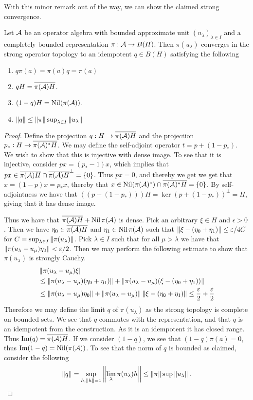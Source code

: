 With this minor remark out of the way, we can show the claimed strong convergence. 
\begin{proposition}\label{mesrennie17}
	Let $\mathcal{A}$ be an operator algebra with bounded approximate unit $(u_{\lambda})_{\lambda \in I}$ and a completely bounded representation $\pi:\mathcal{A} \to B(H)$. Then $\pi(u_\lambda)$ converges in the strong operator topology to an idempotent $q\in B(H)$ satisfying the following 
	\begin{enumerate}
		\item
			$q\pi(a)=\pi(a)q=\pi(a)$
		\item
			$qH=\overline{\pi(\mathcal{A})H}$. 
		\item
			$(1-q)H=\operatorname{Nil}(\pi(\mathcal{A}))$. 
		\item
			$\left \Vert q \right \Vert\leq \left \Vert \pi \right \Vert\sup_{\lambda \in I}\left \Vert u_\lambda \right \Vert$
	\end{enumerate}
\end{proposition}
\begin{proof}
	Define the projection $q:H\to \overline{\pi(\mathcal{A})H}$ and the projection $p_*:H\to \overline{\pi(\mathcal{A})^*H}$. We may define the self-adjoint operator $t=p+(1-p_*)$. We wish to show that this is injective with dense image. To see that it is injective, consider $px=(p_*-1)x$, which implies that $px\in \overline{\pi(\mathcal{A})H}\cap \overline{\pi(\mathcal{A})H}^\perp=\{0\}$. Thus $px=0$, and thereby we get we get that $x=(1-p)x=p_*x$, thereby that $x\in \operatorname{Nil}(\pi(\mathcal{A})^*)\cap \overline{\pi(\mathcal{A})^*H}=\{0\}$. By self-adjointness we have that $\overline{((p+(1-p_*)))H}=\ker(p+(1-p_*))^\perp=H$, giving that it has dense image. 
	
	Thus we have that $\overline{\pi(\mathcal{A})H}+\operatorname{Nil}\pi(\mathcal{A})$ is dense. Pick an arbitrary $\xi\in H$ and $\epsilon>0$. Then we have $\eta_0\in \overline{\pi(\mathcal{A})H}$ and $\eta_1\in \operatorname{Nil}\pi(\mathcal{A})$ such that $\left \Vert \xi-(\eta_0+\eta_1) \right \Vert\leq \varepsilon/4C$ for $C=\sup_{\lambda \in I}\left \Vert \pi(u_{\lambda}) \right \Vert$. Pick $\lambda\in I$ such that for all $\mu>\lambda$ we have that $\left \Vert \pi(u_\lambda-u_\mu)\eta_0 \right \Vert<\varepsilon/2$. Then we may perform the following estimate to show that $\pi(u_\lambda)$ is strongly Cauchy. 
	\begin{align*}
		&\left \Vert \pi(u_{\lambda}-u_\mu)\xi \right \Vert \\
		&\leq \left \Vert \pi(u_\lambda-u_\mu)(\eta_0+\eta_1) \right \Vert+\left \Vert \pi(u_\lambda-u_\mu)(\xi-(\eta_0+\eta_1)) \right \Vert \\
		&\leq \left \Vert \pi(u_\lambda-u_\mu)\eta_0 \right \Vert+\left \Vert \pi(u_\lambda-u_\mu) \right \Vert\left \Vert \xi-(\eta_0+\eta_1) \right \Vert\leq \frac{\varepsilon}{2}+\frac{\varepsilon}{2}
	\end{align*}
	Therefore we may define the limit $q$ of $\pi(u_\lambda)$ as the strong topology is complete on bounded sets. We see that $q$ commutes with the representation, and that $q$ is an idempotent from the construction. As it is an idempotent it has closed range. Thus $\operatorname{Im}(q)=\overline{\pi(\mathcal{A})H}$. If we consider $(1-q)$, we see that $(1-q)\pi(a)=0$, thus $\operatorname{Im}(1-q)=\operatorname{Nil}(\pi(\mathcal{A}))$.
	To see that the norm of $q$ is bounded as claimed, consider the following 
	\begin{align*}
		\left \Vert q \right \Vert=\sup_{h,\left \Vert h \right \Vert=1}\left \Vert \lim_{\lambda}\pi(u_\lambda)h \right \Vert\leq \left \Vert \pi \right \Vert\sup\left \Vert u_\lambda \right \Vert. 
	\end{align*}
\end{proof}
